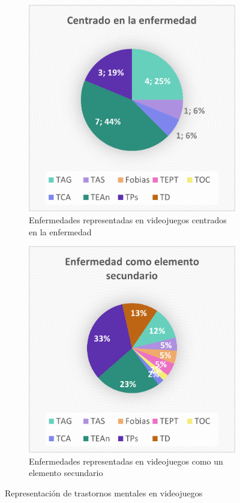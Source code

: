 \documentclass[12pt, a4paper,twoside,titlepage]{book}
\begin{document}
\begin{figure}
\centering
\begin{subfigure}{.5\textwidth}
  \centering
  \includegraphics[width=.95\linewidth]{Graficas estudio/G4; Enfcentrado.png}
  \caption{Enfermedades representadas en videojuegos centrados en la enfermedad}
\end{subfigure}%
\begin{subfigure}{.5\textwidth}
  \centering
  \includegraphics[width=.95\linewidth]{Graficas estudio/G5; Enfsecund.png}
  \caption{Enfermedades representadas en videojuegos como un elemento secundario}
\end{subfigure}
\caption{Representación de trastornos mentales en videojuegos}
\label{fig:ESTEnfcensec}
\end{figure}
\end{document}
